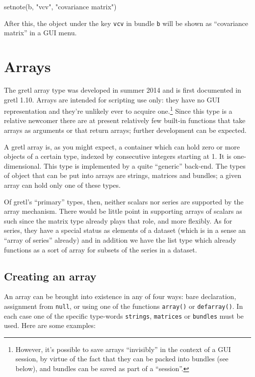 \begin{code}
setnote(b, "vcv", "covariance matrix")
\end{code}

After this, the object under the key \texttt{vcv} in bundle \texttt{b}
will be shown as ``covariance matrix'' in a GUI menu.

\section{Arrays}
\label{sec:arrays}

The gretl array type was developed in summer 2014 and is first
documented in gretl 1.10.  Arrays are intended for scripting use only:
they have no GUI representation and they're unlikely ever to acquire
one.\footnote{However, it's possible to save arrays ``invisibly'' in
  the context of a GUI session, by virtue of the fact that they can be
  packed into bundles (see below), and bundles can be saved as part of
  a ``session''.} Since this type is a relative newcomer there are at
present relatively few built-in functions that take arrays as
arguments or that return arrays; further development can be expected.

A gretl array is, as you might expect, a container which can hold zero
or more objects of a certain type, indexed by consecutive integers
starting at 1. It is one-dimensional. This type is implemented by a
quite ``generic'' back-end. The types of object that can be put into
arrays are strings, matrices and bundles; a given array can hold only
one of these types.

Of gretl's ``primary'' types, then, neither scalars nor series are
supported by the array mechanism. There would be little point in
supporting arrays of scalars as such since the matrix type already
plays that role, and more flexibly. As for series, they have a special
status as elements of a dataset (which is in a sense an ``array of
series'' already) and in addition we have the list type which already
functions as a sort of array for subsets of the series in a dataset.

\subsection{Creating an array}

An array can be brought into existence in any of four ways: bare
declaration, assignment from \texttt{null}, or using one of the
functions \texttt{array()} or \texttt{defarray()}.  In each case one
of the specific type-words \texttt{strings}, \texttt{matrices} or
\texttt{bundles} must be used. Here are some examples:

